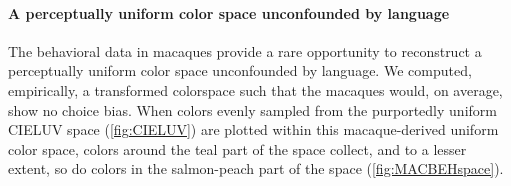 \paragraph{A perceptually uniform color space unconfounded by language}

The behavioral data in macaques provide a rare opportunity to reconstruct a perceptually uniform color space unconfounded by language. 
We computed, empirically, a transformed colorspace such that the macaques would, on average, show no choice bias.
When colors evenly sampled from the purportedly uniform CIELUV space (\autoref{fig:CIELUV}) are plotted within this macaque-derived uniform color space, colors around the teal part of the space collect, and to a lesser extent, so do colors in the salmon-peach part of the space (\autoref{fig:MACBEHspace}). 






